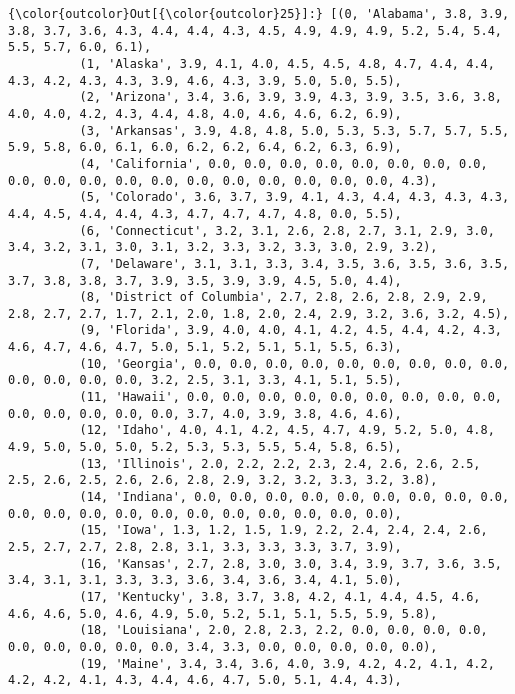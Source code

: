 \documentclass[11pt]{article}
\begin{document}
\begin{Verbatim}[commandchars=\\\{\}]
{\color{outcolor}Out[{\color{outcolor}25}]:} [(0, 'Alabama', 3.8, 3.9, 3.8, 3.7, 3.6, 4.3, 4.4, 4.4, 4.3, 4.5, 4.9, 4.9, 4.9, 5.2, 5.4, 5.4, 5.5, 5.7, 6.0, 6.1),
          (1, 'Alaska', 3.9, 4.1, 4.0, 4.5, 4.5, 4.8, 4.7, 4.4, 4.4, 4.3, 4.2, 4.3, 4.3, 3.9, 4.6, 4.3, 3.9, 5.0, 5.0, 5.5),
          (2, 'Arizona', 3.4, 3.6, 3.9, 3.9, 4.3, 3.9, 3.5, 3.6, 3.8, 4.0, 4.0, 4.2, 4.3, 4.4, 4.8, 4.0, 4.6, 4.6, 6.2, 6.9),
          (3, 'Arkansas', 3.9, 4.8, 4.8, 5.0, 5.3, 5.3, 5.7, 5.7, 5.5, 5.9, 5.8, 6.0, 6.1, 6.0, 6.2, 6.2, 6.4, 6.2, 6.3, 6.9),
          (4, 'California', 0.0, 0.0, 0.0, 0.0, 0.0, 0.0, 0.0, 0.0, 0.0, 0.0, 0.0, 0.0, 0.0, 0.0, 0.0, 0.0, 0.0, 0.0, 0.0, 4.3),
          (5, 'Colorado', 3.6, 3.7, 3.9, 4.1, 4.3, 4.4, 4.3, 4.3, 4.3, 4.4, 4.5, 4.4, 4.4, 4.3, 4.7, 4.7, 4.7, 4.8, 0.0, 5.5),
          (6, 'Connecticut', 3.2, 3.1, 2.6, 2.8, 2.7, 3.1, 2.9, 3.0, 3.4, 3.2, 3.1, 3.0, 3.1, 3.2, 3.3, 3.2, 3.3, 3.0, 2.9, 3.2),
          (7, 'Delaware', 3.1, 3.1, 3.3, 3.4, 3.5, 3.6, 3.5, 3.6, 3.5, 3.7, 3.8, 3.8, 3.7, 3.9, 3.5, 3.9, 3.9, 4.5, 5.0, 4.4),
          (8, 'District of Columbia', 2.7, 2.8, 2.6, 2.8, 2.9, 2.9, 2.8, 2.7, 2.7, 1.7, 2.1, 2.0, 1.8, 2.0, 2.4, 2.9, 3.2, 3.6, 3.2, 4.5),
          (9, 'Florida', 3.9, 4.0, 4.0, 4.1, 4.2, 4.5, 4.4, 4.2, 4.3, 4.6, 4.7, 4.6, 4.7, 5.0, 5.1, 5.2, 5.1, 5.1, 5.5, 6.3),
          (10, 'Georgia', 0.0, 0.0, 0.0, 0.0, 0.0, 0.0, 0.0, 0.0, 0.0, 0.0, 0.0, 0.0, 0.0, 3.2, 2.5, 3.1, 3.3, 4.1, 5.1, 5.5),
          (11, 'Hawaii', 0.0, 0.0, 0.0, 0.0, 0.0, 0.0, 0.0, 0.0, 0.0, 0.0, 0.0, 0.0, 0.0, 0.0, 3.7, 4.0, 3.9, 3.8, 4.6, 4.6),
          (12, 'Idaho', 4.0, 4.1, 4.2, 4.5, 4.7, 4.9, 5.2, 5.0, 4.8, 4.9, 5.0, 5.0, 5.0, 5.2, 5.3, 5.3, 5.5, 5.4, 5.8, 6.5),
          (13, 'Illinois', 2.0, 2.2, 2.2, 2.3, 2.4, 2.6, 2.6, 2.5, 2.5, 2.6, 2.5, 2.6, 2.6, 2.8, 2.9, 3.2, 3.2, 3.3, 3.2, 3.8),
          (14, 'Indiana', 0.0, 0.0, 0.0, 0.0, 0.0, 0.0, 0.0, 0.0, 0.0, 0.0, 0.0, 0.0, 0.0, 0.0, 0.0, 0.0, 0.0, 0.0, 0.0, 0.0),
          (15, 'Iowa', 1.3, 1.2, 1.5, 1.9, 2.2, 2.4, 2.4, 2.4, 2.6, 2.5, 2.7, 2.7, 2.8, 2.8, 3.1, 3.3, 3.3, 3.3, 3.7, 3.9),
          (16, 'Kansas', 2.7, 2.8, 3.0, 3.0, 3.4, 3.9, 3.7, 3.6, 3.5, 3.4, 3.1, 3.1, 3.3, 3.3, 3.6, 3.4, 3.6, 3.4, 4.1, 5.0),
          (17, 'Kentucky', 3.8, 3.7, 3.8, 4.2, 4.1, 4.4, 4.5, 4.6, 4.6, 4.6, 5.0, 4.6, 4.9, 5.0, 5.2, 5.1, 5.1, 5.5, 5.9, 5.8),
          (18, 'Louisiana', 2.0, 2.8, 2.3, 2.2, 0.0, 0.0, 0.0, 0.0, 0.0, 0.0, 0.0, 0.0, 0.0, 3.4, 3.3, 0.0, 0.0, 0.0, 0.0, 0.0),
          (19, 'Maine', 3.4, 3.4, 3.6, 4.0, 3.9, 4.2, 4.2, 4.1, 4.2, 4.2, 4.2, 4.1, 4.3, 4.4, 4.6, 4.7, 5.0, 5.1, 4.4, 4.3),

\end{Verbatim}
\end{document}
